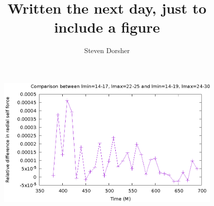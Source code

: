 \documentclass{article}
\begin{document}
\title{Written the next day, just to include a figure}
\author{Steven Dorsher}
\maketitle
\begin{figure}
  \includegraphics{relErrBigSmallRangeOverTime}
\end{figure}
\end{document}
